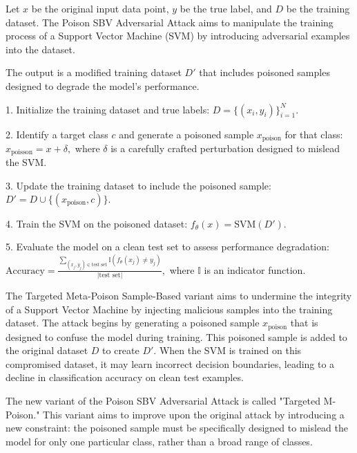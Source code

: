 Let \( x \) be the original input data point, \( y \) be the true label, and \( D \) be the training dataset. The Poison SBV Adversarial Attack aims to manipulate the training process of a Support Vector Machine (SVM) by introducing adversarial examples into the dataset.

The output is a modified training dataset \( D' \) that includes poisoned samples designed to degrade the model's performance.

1. Initialize the training dataset and true labels:
   $
   D = \{(x_i, y_i)\}_{i=1}^N.
   $

2. Identify a target class \( c \) and generate a poisoned sample \( x_{\text{poison}} \) for that class:
   $
   x_{\text{poisson}} = x + \delta,
   $
   where \( \delta \) is a carefully crafted perturbation designed to mislead the SVM.

3. Update the training dataset to include the poisoned sample:
   $
   D' = D \cup \{(x_{\text{poison}}, c)\}.
   $

4. Train the SVM on the poisoned dataset:
   $
   f_{\theta}(x) = \text{SVM}(D').
   $

5. Evaluate the model on a clean test set to assess performance degradation:
   $
   \text{Accuracy} = \frac{\sum_{(x_j, y_j) \in \text{test set}} \mathbb{I}(f_{\theta}(x_j) \neq y_j)}{|\text{test set}|},
   $
   where \( \mathbb{I} \) is an indicator function.

The Targeted Meta-Poison Sample-Based variant aims to undermine the integrity of a Support Vector Machine by injecting malicious samples into the training dataset. The attack begins by generating a poisoned sample \( x_{\text{poison}} \) that is designed to confuse the model during training. This poisoned sample is added to the original dataset \( D \) to create \( D' \). When the SVM is trained on this compromised dataset, it may learn incorrect decision boundaries, leading to a decline in classification accuracy on clean test examples.

The new variant of the Poison SBV Adversarial Attack is called "Targeted M-Poison." This variant aims to improve upon the original attack by introducing a new constraint: the poisoned sample must be specifically designed to mislead the model for only one particular class, rather than a broad range of classes.
